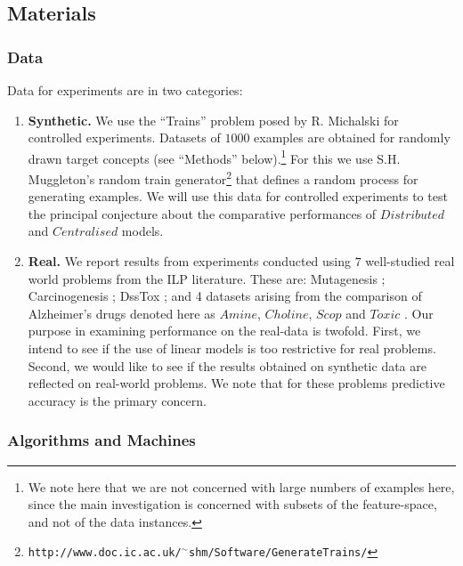 \subsection{Materials}
\label{sec:exptmat}


\subsubsection{Data}
Data for experiments are in two categories:
\begin{enumerate}
\item \textbf{Synthetic. } We use the ``Trains'' problem
    posed by R. Michalski for controlled experiments. Datasets
    of $1000$ examples
    are obtained for randomly drawn target concepts
    (see ``Methods'' below).\footnote{We note here that we are not concerned
    with large numbers of examples here, since the main investigation is
    concerned with subsets of the feature-space, and not of the data instances.}
    For this we use S.H. Muggleton's random train
    generator\footnote{{\tt http://www.doc.ic.ac.uk/$\mbox{}^\sim$shm/Software/GenerateTrains/}}                                                                                                                                             
    that defines a random process for generating examples. We will use this
    data for controlled experiments to test the principal conjecture
    about the comparative performances of $Distributed$ and $Centralised$ models.

\item \textbf{Real. } We report results from experiments conducted using $7$
    well-studied real world problems from the ILP literature. These are:
    Mutagenesis \cite{King_96}; Carcinogenesis \cite{King_96a}; DssTox \cite{Muggleton_08a};
    and 4 datasets arising from the comparison of Alzheimer's drugs
    denoted here as $Amine$, $Choline$, $Scop$ and $Toxic$ \cite{Srinivasan_1996y}.
    Our purpose in examining performance
    on the real-data is twofold. First, we intend to see if the use of
    linear models is too restrictive for real problems. Second, we would like to see
    if the results obtained on
    synthetic data are reflected on real-world problems. We note that for
    these problems predictive accuracy is the primary concern.
\end{enumerate}

\subsubsection{Algorithms and Machines}

